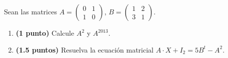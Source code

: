 
Sean las matrices $A=\begin{pmatrix}0&1\\1&0\end{pmatrix}$, $B=\begin{pmatrix}1&2\\3&1\end{pmatrix}$.
\begin{enumerate}[label=\alph*)]
\item \textbf{(1 punto)} Calcule $A^2$ y $A^{2013}$.
\item \textbf{(1.5 puntos)} Resuelva la ecuación matricial $A\cdot X+I_2=5B^t-A^2$.
\end{enumerate}

